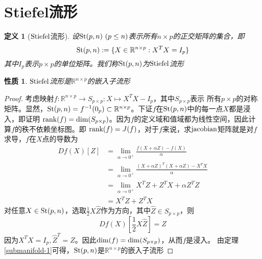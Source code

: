\documentclass{article}
\newtheorem{definition}{定义}[section]
\newtheorem{proposition}{性质}[section]
\begin{document}
\section{Stiefel流形}
\begin{definition}[${\rm Stiefel}$流形]
    设${\rm St}(p,n) \ (p \leq n)$表示所有$n \times p$的正交矩阵的集合，即
    $$
    {\rm St}(p,n):=\{X \in \mathbb{R}^{n \times p}:X^TX=I_{p}\}
    $$
    其中$I_{p}$表示$p \times p$的单位矩阵。我们称${\rm St}(p,n)$为${\rm Stiefel}$流形
\end{definition}
\begin{proposition}
    ${\rm Stiefel}$流形是$\mathbb{R}^{n \times p}$的嵌入子流形
\end{proposition}
\begin{proof}
    考虑映射$f:\mathbb{R}^{n \times p} \to S_{p \times p}:X \mapsto X^TX-I_{p}$，其中$S_{p \times p}$表示
    所有$p \times p$的对称矩阵。显然，${\rm St}(p,n)=f^{-1}(0_{p})\subset \mathbb{R}^{n \times p}$。下证$f$在${\rm St}(p,n)$中的每一点$X$都是浸入，即证明
    ${\rm rank}(f)={\rm dim}(S_{p \times p})$。因为$f$的定义域和值域都为线性空间，因此计算$f$的秩不依赖坐标图。即
    ${\rm rank}(f)=J(f)$，对于$f$来说，求${\rm jacobian}$矩阵就是对$f$求导，$f$在$X$点的导数为
    $$
    \begin{aligned}
        Df(X)[Z]&=\lim_{\alpha \to 0^+}\frac{f(X+\alpha Z)-f(X)}{\alpha}\\
        &=\lim_{\alpha \to 0^+}\frac{(X+\alpha Z)^T(X+\alpha Z)-X^TX}{\alpha}\\
        &=\lim_{\alpha \to 0^+}X^TZ+Z^TX+\alpha Z^TZ\\
        &=X^TZ+Z^TX
    \end{aligned}
    $$
    对任意$X \in {\rm St}(p,n)$，选取$\frac{1}{2}X\hat{Z}$作为方向，其中$\hat{Z} \in S_{p \times p}$，则
    $$
    Df(X)\left[\frac{1}{2}X\hat{Z}\right]=\hat{Z} 
    $$
    因为$X^TX=I_{p},{\hat{Z}}^T=\hat{Z}$。因此${\rm dim}(f)={\rm dim}(S_{p \times p})$，从而$f$是浸入。
    由定理\ref{submanifold-1}可得，${\rm St}(p,n)$是$\mathbb{R}^{n \times p}$的嵌入子流形
\end{proof}
\end{document}
